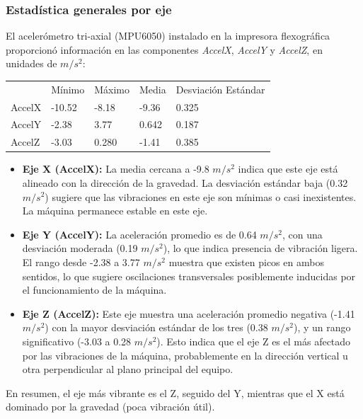 \documentclass{article}
\begin{document}
\subsubsection{Estadística generales por eje}
El acelerómetro tri-axial (MPU6050) instalado en la impresora flexográfica proporcionó información en las componentes \textit{AccelX}, \textit{AccelY} y \textit{AccelZ}, en unidades de ${m}/{s^2}$:
\begin{table}[H]
\centering
\begin{tabular}{lllll}
       & Mínimo & Máximo & Media & Desviación Estándar \\
AccelX & -10.52 & -8.18  & -9.36 & 0.325               \\
AccelY & -2.38  & 3.77   & 0.642 & 0.187               \\
AccelZ & -3.03  & 0.280  & -1.41 & 0.385              
\end{tabular}
\end{table}
\begin{itemize}
    \item \textbf{Eje X (AccelX):} La media cercana a -9.8 ${m}/{s^2}$ indica que este eje está alineado con la dirección de la gravedad. La desviación estándar baja (0.32 ${m}/{s^2}$) sugiere que las vibraciones en este eje son mínimas o casi inexistentes. La máquina permanece estable en este eje.
    \item \textbf{Eje Y (AccelY):} La aceleración promedio es de 0.64 ${m}/{s^2}$, con una desviación moderada (0.19 ${m}/{s^2}$), lo que indica presencia de vibración ligera. El rango desde -2.38 a 3.77 ${m}/{s^2}$ muestra que existen picos en ambos sentidos, lo que sugiere oscilaciones transversales posiblemente inducidas por el funcionamiento de la máquina.
    \item \textbf{Eje Z (AccelZ):} Este eje muestra una aceleración promedio negativa (-1.41 ${m}/{s^2}$) con la mayor desviación estándar de los tres (0.38 ${m}/{s^2}$), y un rango significativo (-3.03 a 0.28 ${m}/{s^2}$). Esto indica que el eje Z es el más afectado por las vibraciones de la máquina, probablemente en la dirección vertical u otra perpendicular al plano principal del equipo.
\end{itemize}
En resumen, el eje más vibrante es el Z, seguido del Y, mientras que el X está dominado por la gravedad (poca vibración útil).
\end{document}
